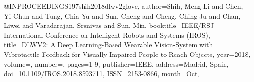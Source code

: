 @INPROCEEDINGS{197shih2018dlwv2glove,
author={Shih, Meng-Li and Chen, Yi-Chun and Tung, Chia-Yu and Sun, Cheng and Cheng, Ching-Ju and Chan, Liwei and Varadarajan, Srenivas and Sun, Min},
booktitle={IEEE/RSJ International Conference on Intelligent Robots and Systems (IROS)}, 
title={DLWV2: A Deep Learning-Based Wearable Vision-System with Vibrotactile-Feedback for Visually Impaired People to Reach Objects}, 
year={2018},
volume={},
number={},
pages={1-9},
publisher={IEEE},
address={Madrid, Spain},
doi={10.1109/IROS.2018.8593711},
ISSN={2153-0866},
month={Oct},}